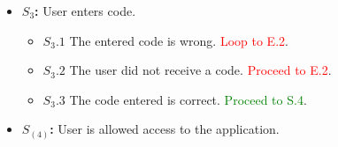 \documentclass[]{article}
\begin{document}
\begin{enumerate}[\bf {BE}2.]
{{\begin{itemize}
						\item {\bf $S_{3}$:}  User enters code. 
                            \begin{itemize}
                                \item {\bf $S_{3}.1$} The entered code is wrong. \textcolor{red}{Loop to E.2}.
                                \item {\bf $S_{3}.2$} The user did not receive a code. \textcolor{red}{Proceed to E.2}.
                                \item {\bf $S_{3}.3$} The code entered is correct. \textcolor{green}{Proceed to S.4}.
                            \end{itemize}
					\item {\bf $S_{(4)}$:} User is allowed access to the application.
				\end{itemize}
			}%
		}%
		\end{enumerate}
  
\end{document}
